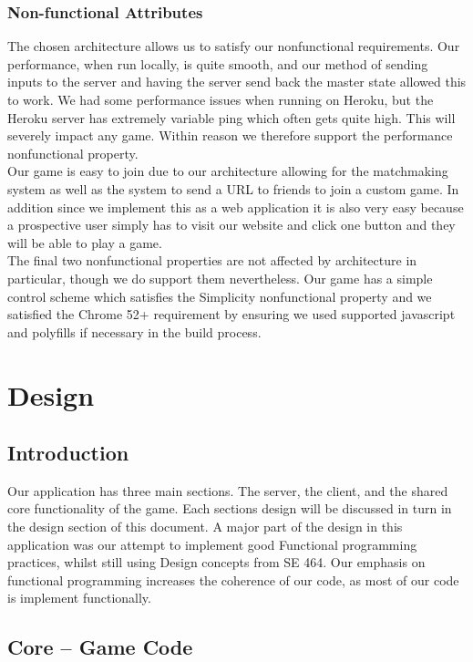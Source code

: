 \documentclass[12pt]{report}
\begin{document}
\subsection{Non-functional Attributes}
The chosen architecture allows us to satisfy our nonfunctional requirements. Our performance, when run locally, is quite smooth, and our method of sending inputs to the server and having the server send back the master state allowed this to work. We had some performance issues when running on Heroku, but the Heroku server has extremely variable ping which often gets quite high. This will severely impact any game. Within reason we therefore support the performance nonfunctional property. \\
Our game is easy to join due to our architecture allowing for the matchmaking system as well as the system to send a URL to friends to join a custom game. In addition since we implement this as a web application it is also very easy because a prospective user simply has to visit our website and click one button and they will be able to play a game. \\
The final two nonfunctional properties are not affected by architecture in particular, though we do support them nevertheless. Our game has a simple control scheme which satisfies the Simplicity nonfunctional property and we satisfied the Chrome 52+ requirement by ensuring we used supported javascript and polyfills if necessary in the build process.


\chapter{Design}

\section{Introduction}
Our application has three main sections. The server, the client, and the shared core functionality of the game. Each sections design will be discussed in turn in the design section of this document. A major part of the design in this application was our attempt to implement good Functional programming practices, whilst still using Design concepts from SE 464. Our emphasis on functional programming increases the coherence of our code, as most of our code is implement functionally.  
\section{Core -- Game Code}
\end{document}

